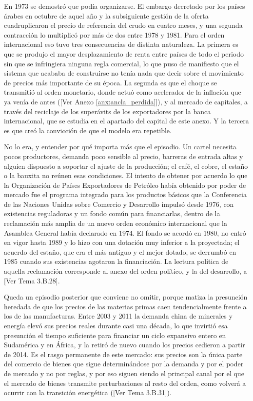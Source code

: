 \documentclass[10pt,a4paper]{article}
\newcommand{\authorfont}[1]{{\fontfamily{EBGaramond-TLF}\selectfont #1}}
\newcounter{anexo}
\begin{document}
En 1973 se demostró que podía organizarse. El embargo decretado por los países árabes en octubre de aquel año y la subsiguiente gestión de la oferta cuadruplicaron el precio de referencia del crudo en cuatro meses, y una segunda contracción lo multiplicó por más de dos entre 1978 y 1981. Para el orden internacional eso tuvo tres consecuencias de distinta naturaleza. La primera es que se produjo el mayor desplazamiento de renta entre países de todo el periodo sin que se infringiera ninguna regla comercial, lo que puso de manifiesto que el sistema que acababa de construirse no tenía nada que decir sobre el movimiento de precios más importante de su época. La segunda es que el choque se transmitió al orden monetario, donde actuó como acelerador de la inflación que ya venía de antes ([\authorfont{Ver Anexo \ref{anx:ancla_perdida}}]), y al mercado de capitales, a través del reciclaje de los superávits de los exportadores por la banca internacional, que se estudia en el apartado del capital de este anexo. Y la tercera es que creó la convicción de que el modelo era repetible.

No lo era, y entender por qué importa más que el episodio. Un cartel necesita pocos productores, demanda poco sensible al precio, barreras de entrada altas y alguien dispuesto a soportar el ajuste de la producción; el café, el cobre, el estaño o la bauxita no reúnen esas condiciones. El intento de obtener por acuerdo lo que la Organización de Países Exportadores de Petróleo había obtenido por poder de mercado fue el programa integrado para los productos básicos que la Conferencia de las Naciones Unidas sobre Comercio y Desarrollo impulsó desde 1976, con existencias reguladoras y un fondo común para financiarlas, dentro de la reclamación más amplia de un nuevo orden económico internacional que la Asamblea General había declarado en 1974. El fondo se acordó en 1980, no entró en vigor hasta 1989 y lo hizo con una dotación muy inferior a la proyectada; el acuerdo del estaño, que era el más antiguo y el mejor dotado, se derrumbó en 1985 cuando sus existencias agotaron la financiación. La lectura política de aquella reclamación corresponde al anexo del orden político, y la del desarrollo, a [\authorfont{Ver Tema 3.B.28}].

Queda un episodio posterior que conviene no omitir, porque matiza la presunción heredada de que los precios de las materias primas caen tendencialmente frente a los de las manufacturas. Entre 2003 y 2011 la demanda china de minerales y energía elevó sus precios reales durante casi una década, lo que invirtió esa presunción el tiempo suficiente para financiar un ciclo expansivo entero en Sudamérica y en África, y la retiró de nuevo cuando los precios cedieron a partir de 2014. Es el rasgo permanente de este mercado: sus precios son la única parte del comercio de bienes que sigue determinándose por la demanda y por el poder de mercado y no por reglas, y por eso siguen siendo el principal canal por el que el mercado de bienes transmite perturbaciones al resto del orden, como volverá a ocurrir con la transición energética ([\authorfont{Ver Tema 3.B.31}]).
\end{document}
